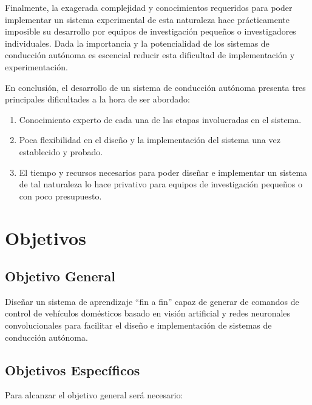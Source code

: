 \documentclass[12pt,letterpaper]{article}
\begin{document}
Finalmente, la exagerada complejidad y conocimientos requeridos para poder implementar un sistema experimental 
de esta naturaleza hace prácticamente imposible su desarrollo por equipos de investigación pequeños o investigadores 
individuales. Dada la importancia y la potencialidad de los sistemas de conducción autónoma es escencial reducir 
esta dificultad de implementación y experimentación.

En conclusión, el desarrollo de un sistema de conducción autónoma presenta tres principales dificultades a la hora de 
ser abordado: 
\begin{enumerate}
    \item Conocimiento experto de cada una de las etapas involucradas en el sistema.
    \item Poca flexibilidad en el diseño y la implementación del sistema una vez establecido y probado.
    \item El tiempo y recursos necesarios para poder diseñar e implementar un sistema de tal naturaleza lo hace privativo para equipos de investigación pequeños o con poco presupuesto.
\end{enumerate}
\section{Objetivos}
\subsection{Objetivo General}

Diseñar un sistema de aprendizaje “fin a fin” capaz de generar de comandos de 
control de vehículos domésticos basado en visión artificial y redes neuronales 
convolucionales para facilitar el diseño e implementación de sistemas de conducción autónoma.

\subsection{Objetivos Específicos}
Para alcanzar el objetivo general será necesario:
\end{document}

